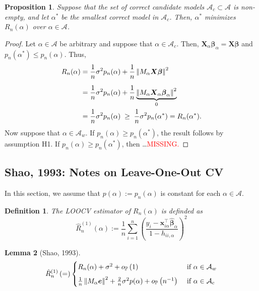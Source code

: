 \documentclass[12pt, letter paper]{article}
\newcommand{\1}{\mathmybb{1}}
\newtheorem{definition}{Definition}[section]
\newtheorem{proposition}{Proposition}[section]
\newtheorem{lemma}[proposition]{Lemma}
\newcommand{\0}{\emptyset}
\newcommand{\prob}{\mathbb{P}}
\newcommand{\paren}[1]{\left(#1 \right)}
\newcommand{\norm}[1]{\left|\hspace{-1pt}\left|#1 \right|\hspace{-1pt}\right|}
\newcommand{\normsq}[1]{\norm{#1}^{2}}
\newcommand{\Acal}{\mathcal{A}}
\newcommand{\X}{\boldsymbol{X}}
\newcommand{\x}{\boldsymbol{x}}
\newcommand{\e}{\boldsymbol{e}}
\newcommand{\bbeta}{\boldsymbol{\beta}}
\newcommand{\bbetahat}{\boldsymbol{\hat{\beta}}}
\newcommand{\loocv}[1]{\hat{R}^{(1)}_{n}\paren{#1}}
\newcommand{\op}[1]{o_{\prob}\paren{#1}}
\begin{document}
\begin{proposition}
    Suppose that the set of correct candidate models \(\Acal_{c}\subset\Acal\) is non-empty, and let \(\alpha^{*}\) be the smallest correct model in \(\Acal_{c}\). Then, \(\alpha^{*}\) minimizes \(R_{n}(\alpha)\) over \(\alpha\in\Acal\).
\end{proposition}

\begin{proof}
    Let \(\alpha\in\Acal\) be arbitrary and suppose that \(\alpha\in\Acal_{c}\). Then, \(\X_{\alpha}\bbeta_{\alpha} = \X\bbeta\) and \(p_{n}(\alpha^{*})\leq p_{n}(\alpha)\). Thus,
    \begin{align*}
        R_{n}(\alpha) &= \frac{1}{n}\sigma^{2}p_{n}(\alpha) + \frac{1}{n}\normsq{M_{\alpha}\X\bbeta}\\[2mm]
        &= \frac{1}{n} \sigma^{2}p_{n}(\alpha) + \frac{1}{n}\underbrace{\normsq{M_{\alpha}\X_{\alpha}\bbeta_{\alpha}}}_{0}\\
        &= \frac{1}{n}\sigma^{2}p_{n}(\alpha)\; \geq \; \frac{1}{n}\sigma^{2}p_{n}(\alpha^{*}) = R_{n}(\alpha^{*}).
    \end{align*}
    Now suppose that \(\alpha\in\Acal_{w}\). If \(p_{n}(\alpha)\geq p_{n}(\alpha^{*})\), the result follows by assumption H1. If \(p_{n}(\alpha)\geq p_{n}(\alpha^{*})\), then \ldots \textcolor{red}{MISSING.}
\end{proof}

\subsection{Shao, 1993: Notes on Leave-One-Out CV}
In this section, we assume that \(p(\alpha):=p_n(\alpha)\) is constant for each \(\alpha\in\Acal\).
\begin{definition}
    The LOOCV estimator of \(R_{n}(\alpha)\) is definded as
    \[\loocv{\alpha}:= \frac{1}{n}\sum_{i=1}^{n}\paren{\frac{y_{i}-\x_{i\alpha}^{\top}\bbetahat_{\alpha}}{1-h_{ii,\alpha}}}^{2}\]
\end{definition}

\begin{lemma}[Shao, 1993]
    \[\loocv = \begin{cases}
        R_{n}(\alpha) + \sigma^{2} + \op{1} &\text{ if }\alpha\in\Acal_{w}\\[2mm]
        \frac{1}{n}\normsq{M_{\alpha}\e} + \frac{2}{n}\sigma^{2}p(\alpha) + \op{n^{-1}} &\text{ if }\alpha\in\Acal_{c}
    \end{cases}\]
\end{lemma}
\end{document}
